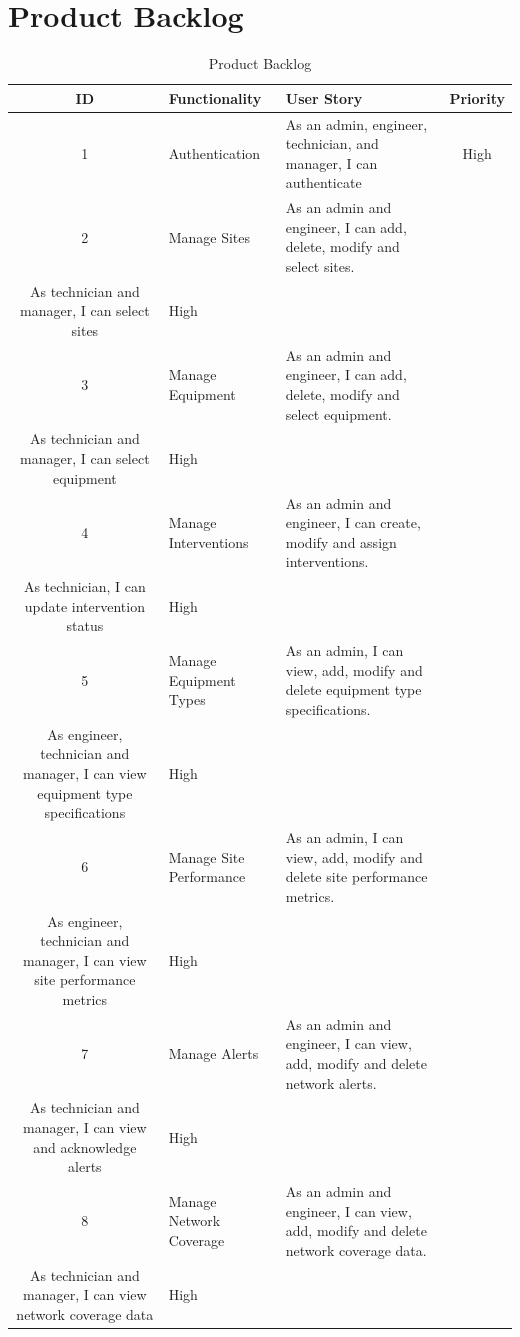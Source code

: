 \section{Product Backlog}
\begin{longtable}{|c|p{4cm}|p{7cm}|c|}
\caption{Product Backlog} \\ \hline
\textbf{ID} & \textbf{Functionality} & \textbf{User Story} & \textbf{Priority} \\ \hline
1 & Authentication & As an admin, engineer, technician, and manager, I can authenticate & High \\ \hline
2 & Manage Sites & As an admin and engineer, I can add, delete, modify and select sites.\vspace{0.25cm} \\ As technician and manager, I can select sites & High \\ \hline
3 & Manage Equipment & As an admin and engineer, I can add, delete, modify and select equipment.\vspace{0.25cm} \\ As technician and manager, I can select equipment & High \\ \hline
4 & Manage Interventions & As an admin and engineer, I can create, modify and assign interventions.\vspace{0.25cm} \\ As technician, I can update intervention status & High \\ \hline
5 & Manage Equipment Types & As an admin, I can view, add, modify and delete equipment type specifications.\vspace{0.25cm} \\ As engineer, technician and manager, I can view equipment type specifications & High \\ \hline
6 & Manage Site Performance & As an admin, I can view, add, modify and delete site performance metrics.\vspace{0.25cm} \\ As engineer, technician and manager, I can view site performance metrics & High \\ \hline
7 & Manage Alerts & As an admin and engineer, I can view, add, modify and delete network alerts.\vspace{0.25cm} \\ As technician and manager, I can view and acknowledge alerts & High \\ \hline
8 & Manage Network Coverage & As an admin and engineer, I can view, add, modify and delete network coverage data.\vspace{0.25cm} \\ As technician and manager, I can view network coverage data & High \\ \hline

\end{longtable}
